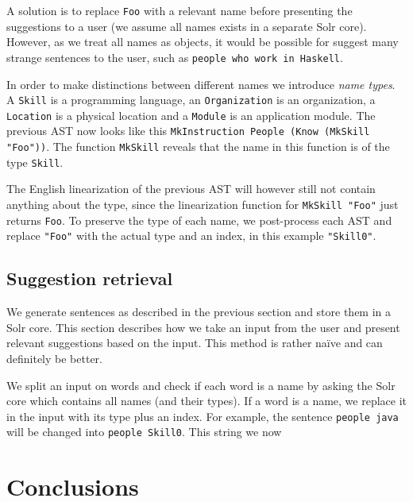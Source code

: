 \documentclass[10pt, a4paper]{article}
\begin{document}
A solution is to replace \texttt{Foo} with a relevant name before presenting the suggestions to a user (we assume all names exists in a separate Solr core). However, as we treat all names as objects, it would be possible for suggest many strange sentences to the user, such as \texttt{people who work in Haskell}.

In order to make distinctions between different names we introduce \emph{name types}. A \texttt{Skill} is a programming language, an \texttt{Organization} is an organization, a \texttt{Location} is a physical location and a \texttt{Module} is an application module. The previous AST now looks like this \texttt{MkInstruction People (Know (MkSkill "Foo"))}. The function \texttt{MkSkill} reveals that the name in this function is of the type \texttt{Skill}. 

The English linearization of the previous AST will however still not contain anything about the type, since the linearization function for \texttt{MkSkill "Foo"} just returns \texttt{Foo}. To preserve the type of each name, we post-process each AST and replace \texttt{"Foo"} with the actual type and an index, in this example \texttt{"Skill0"}.

\subsection{Suggestion retrieval}
 We generate sentences as described in the previous section and store them in a Solr core. This section describes how we take an input from the user and present relevant suggestions based on the input. This method is rather naïve and can definitely be better.

 We split an input on words and check if each word is a name by asking the Solr core which contains all names (and their types). If a word is a name, we replace it in the input with its type plus an index. For example, the sentence \texttt{people java} will be changed into \texttt{people Skill0}. This string we now 

\section{Conclusions}


% 


\end{document}
